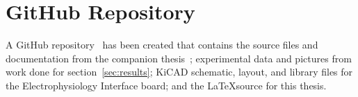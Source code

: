 \documentclass{article}
\begin{document}
\section{GitHub Repository}

A GitHub repository~\cite{BatzerRepo} has been created that contains the source files and documentation from the companion thesis~\cite{BatzerMSEE}; experimental data and pictures from work done for section~\ref{sec:results}; KiCAD schematic, layout, and library files for the Electrophysiology Interface board; and the \LaTeX source for this thesis.

\newpage

\begin{singlespace} 


{}


\end{singlespace}
\end{document}

